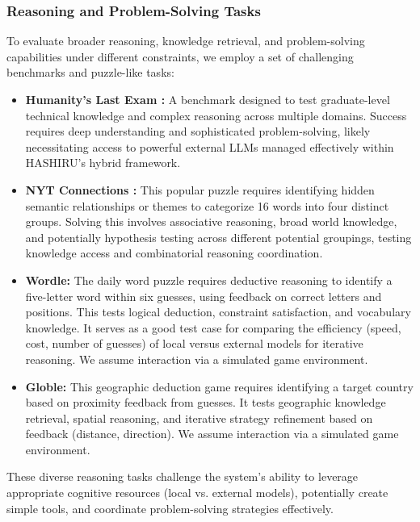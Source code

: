 \documentclass[conference]{IEEEtran}
\begin{document}
\subsubsection{Reasoning and Problem-Solving Tasks}
To evaluate broader reasoning, knowledge retrieval, and problem-solving capabilities under different constraints, we employ a set of challenging benchmarks and puzzle-like tasks:
\begin{itemize}
    \item \textbf{Humanity's Last Exam \cite{phan2025humanitysexam}:} A benchmark designed to test graduate-level technical knowledge and complex reasoning across multiple domains. Success requires deep understanding and sophisticated problem-solving, likely necessitating access to powerful external LLMs managed effectively within HASHIRU's hybrid framework.
    \item \textbf{NYT Connections \cite{lopez2024nyt}:} This popular puzzle requires identifying hidden semantic relationships or themes to categorize 16 words into four distinct groups. Solving this involves associative reasoning, broad world knowledge, and potentially hypothesis testing across different potential groupings, testing knowledge access and combinatorial reasoning coordination.
    \item \textbf{Wordle:} The daily word puzzle requires deductive reasoning to identify a five-letter word within six guesses, using feedback on correct letters and positions. This tests logical deduction, constraint satisfaction, and vocabulary knowledge. It serves as a good test case for comparing the efficiency (speed, cost, number of guesses) of local versus external models for iterative reasoning. We assume interaction via a simulated game environment.
    \item \textbf{Globle:} This geographic deduction game requires identifying a target country based on proximity feedback from guesses. It tests geographic knowledge retrieval, spatial reasoning, and iterative strategy refinement based on feedback (distance, direction). We assume interaction via a simulated game environment. 
\end{itemize}
These diverse reasoning tasks challenge the system's ability to leverage appropriate cognitive resources (local vs. external models), potentially create simple tools, and coordinate problem-solving strategies effectively.
\end{document}
